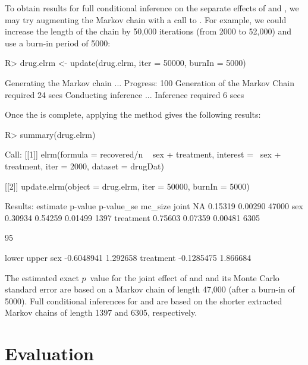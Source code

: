 \documentclass[article, shortnames]{jss}
\begin{document}
To obtain results for full conditional inference on the separate
effects of  and , we may try augmenting
the Markov chain with a call to . For example, we
could increase the length of the chain by 50,000 iterations (from
2000 to 52,000) and use a burn-in period of 5000:
\begin{CodeChunk}
\begin{CodeInput}
R> drug.elrm <- update(drug.elrm, iter = 50000, burnIn = 5000)
\end{CodeInput}
\begin{CodeOutput}
Generating the Markov chain ...
Progress: 100%
Generation of the Markov Chain required 24 secs
Conducting inference ...
Inference required 6 secs
\end{CodeOutput}
\end{CodeChunk}
Once the  is complete, applying the  method
gives the following results:
\begin{CodeChunk}
\begin{CodeInput}
R> summary(drug.elrm)
\end{CodeInput}
\begin{CodeOutput}
Call: [[1]] elrm(formula = recovered/n ~ sex + treatment,
                 interest = ~sex + treatment, iter = 2000,
                 dataset = drugDat)

[[2]] update.elrm(object = drug.elrm, iter = 50000, burnIn = 5000)

Results:
          estimate p-value p-value_se mc_size
joint           NA 0.15319    0.00290   47000
sex        0.30934 0.54259    0.01499    1397
treatment  0.75603 0.07359    0.00481    6305

95%

               lower    upper
sex       -0.6048941 1.292658
treatment -0.1285475 1.866684
\end{CodeOutput}
\end{CodeChunk}
The estimated exact $p$~value for the joint effect of  and
 and its Monte Carlo standard error are based on a
Markov chain of length 47,000 (after a burn-in of 5000). Full
conditional inferences for  and  are
based on the shorter extracted Markov chains of length 1397 and
6305, respectively.

\section{Evaluation} \label{Evaluation}
\end{document}
